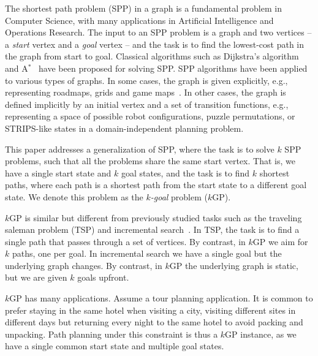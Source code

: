 \documentclass{aicom2e}
\newcommand{\kgs}{$k$GP}
\newcommand{\astar}{A$^*$}
\newcommand{\roni}[1]{\textbf{[RS:#1]}}
\begin{document}
The shortest path problem (SPP) in a graph is a fundamental problem in Computer
Science, with many applications in Artificial Intelligence and Operations
Research. The input to an SPP problem is a graph and two vertices -- a {\em
start} vertex and a {\em goal} vertex -- and the task is to find the
lowest-cost path in the graph from start to goal. Classical algorithms such as
Dijkstra's algorithm~\cite{DIJ59} and \astar{}~\cite{hartNR68Astar} have been
proposed for solving SPP. SPP algorithms have been applied to various types of
graphs. In some cases, the graph is given explicitly, e.g., representing
roadmaps, grids and game maps~\cite{sturtevant2012benchmarks}. In other cases,
the graph is defined implicitly by an initial vertex and a set of transition
functions, e.g., representing a space of possible robot configurations, puzzle
permutations, or STRIPS-like states in a domain-independent planning problem.



This paper addresses a generalization of SPP, where the task is to solve $k$
SPP problems, such that all the problems share the same start vertex. That is,
we have a single start state and $k$ goal states, and the task is to find $k$
shortest paths, where each path is a shortest path from the start state to a
different goal state. We denote this problem as the {\em $k$-goal} problem
(\kgs{}).



\kgs{} is similar but different from previously studied tasks such as the
traveling saleman problem (TSP) and incremental
search~\cite{koenig2004lifelong}. In TSP, the task is to find a single path
that passes through a set of vertices. By contrast, in \kgs{} we aim for $k$
paths, one per goal. In incremental search we have a single goal but the
underlying graph changes. By contrast, in \kgs{} the underlying graph is static,
but we are given $k$ goals upfront. %



\kgs{} has many applications. Assume a tour planning application. It is common
to prefer staying in the same hotel when visiting a city, visiting different
sites in different days but returning every night to the same hotel to avoid
packing and unpacking. Path planning under this constraint is thus a \kgs{}
instance, as we have a single common start state and multiple goal states.
\end{document}
